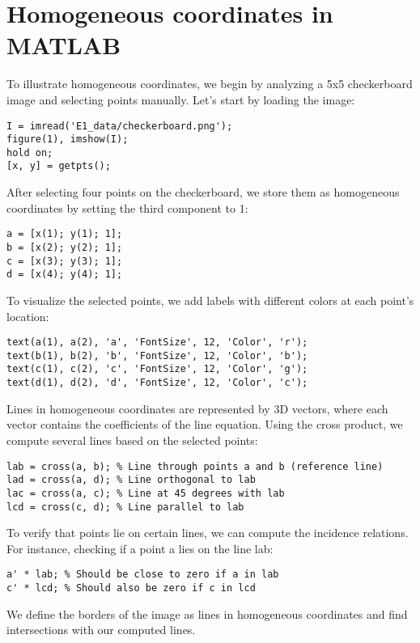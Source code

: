 \section{Homogeneous coordinates in MATLAB}

To illustrate homogeneous coordinates, we begin by analyzing a 5x5 checkerboard image and selecting points manually. 
Let's start by loading the image:
\begin{lstlisting}[style=MATLAB] 
% Load the checkerboard image
I = imread('E1_data/checkerboard.png');
figure(1), imshow(I);
hold on;
[x, y] = getpts();
\end{lstlisting}
After selecting four points on the checkerboard, we store them as homogeneous coordinates by setting the third component to 1:
\begin{lstlisting}[style=MATLAB] 
% Define points in homogeneous coordinates
a = [x(1); y(1); 1];
b = [x(2); y(2); 1];
c = [x(3); y(3); 1];
d = [x(4); y(4); 1];
\end{lstlisting}
To visualize the selected points, we add labels with different colors at each point's location:
\begin{lstlisting}[style=MATLAB] 
% Display points on the image
text(a(1), a(2), 'a', 'FontSize', 12, 'Color', 'r');
text(b(1), b(2), 'b', 'FontSize', 12, 'Color', 'b');
text(c(1), c(2), 'c', 'FontSize', 12, 'Color', 'g');
text(d(1), d(2), 'd', 'FontSize', 12, 'Color', 'c');
\end{lstlisting}
Lines in homogeneous coordinates are represented by 3D vectors, where each vector contains the coefficients of the line equation. 
Using the cross product, we compute several lines based on the selected points:
\begin{lstlisting}[style=MATLAB] 
% Compute lines from pairs of points
lab = cross(a, b); % Line through points a and b (reference line)
lad = cross(a, d); % Line orthogonal to lab
lac = cross(a, c); % Line at 45 degrees with lab
lcd = cross(c, d); % Line parallel to lab
\end{lstlisting}
To verify that points lie on certain lines, we can compute the incidence relations. For instance, checking if a point a lies on the line lab:
\begin{lstlisting}[style=MATLAB] 
% Check incidence relations
a' * lab; % Should be close to zero if a in lab
c' * lcd; % Should also be zero if c in lcd
\end{lstlisting}
We define the borders of the image as lines in homogeneous coordinates and find intersections with our computed lines.
